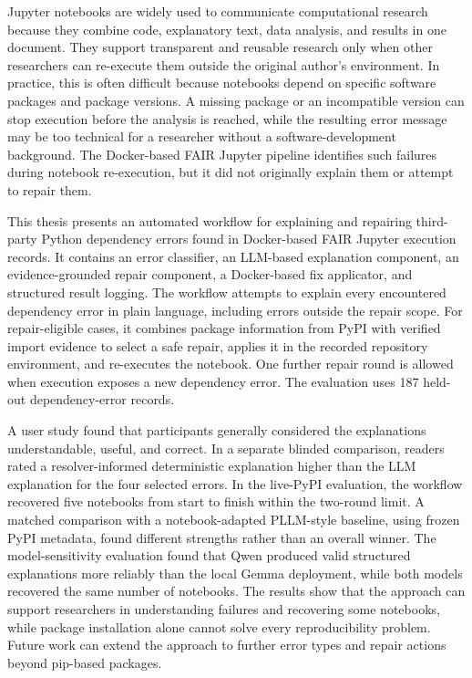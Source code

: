 Jupyter notebooks are widely used to communicate computational research because
they combine code, explanatory text, data analysis, and results in one document.
They support transparent and reusable research only when other researchers can
re-execute them outside the original author's environment. In practice, this is
often difficult because notebooks depend on specific software packages and
package versions. A missing package or an incompatible version can stop
execution before the analysis is reached, while the resulting error message may
be too technical for a researcher without a software-development background.
The Docker-based FAIR Jupyter pipeline identifies such failures during notebook
re-execution, but it did not originally explain them or attempt to repair them.


This thesis presents an automated workflow for explaining and repairing
third-party Python dependency errors found in Docker-based FAIR Jupyter
execution records. It contains an error classifier, an LLM-based explanation
component, an evidence-grounded repair component, a Docker-based fix
applicator, and structured result logging. The workflow attempts to explain
every encountered dependency error in plain language, including errors outside
the repair scope. For repair-eligible cases, it combines
package information from PyPI with verified import evidence to select a safe
repair, applies it in the recorded repository environment, and re-executes the
notebook. One further repair round is allowed when execution exposes a new
dependency error. The evaluation uses 187 held-out dependency-error records.

A user study found that participants generally considered the explanations
understandable, useful, and correct. In a separate blinded comparison, readers
rated a resolver-informed deterministic explanation higher than the LLM
explanation for the four selected errors. In the live-PyPI evaluation, the workflow
recovered five notebooks from start to finish within the two-round limit. A
matched comparison with a notebook-adapted PLLM-style baseline, using frozen
PyPI metadata, found different strengths rather than an overall winner. The
model-sensitivity evaluation found that Qwen produced valid structured
explanations more reliably than the local Gemma deployment, while both models
recovered the same number of notebooks. The results show
that the approach can support researchers in understanding failures and
recovering some notebooks, while package installation alone cannot solve every
reproducibility problem. Future work can extend the approach to further error
types and repair actions beyond pip-based packages.
